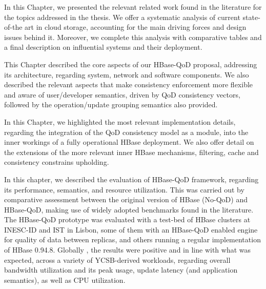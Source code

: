 
In this Chapter, we presented the relevant related work found in the literature for the topics addressed in the thesis. We offer a systematic analysis of current state-of-the art in cloud storage, accounting for the main driving forces and design issues behind it. Moreover, we complete this analysis with comparative tables and a final description on influential systems and their deployment. 


This Chapter described the core aspects of our HBase-QoD proposal, addressing its architecture, regarding system, network and software components. We also described the relevant aspects that make consistency enforcement more flexible and aware of user/developer semantics, driven by QoD consistency vectors, followed by the operation/update grouping semantics also provided.


In this Chapter, we highlighted the most relevant implementation details, regarding the integration of the QoD consistency model as a module, into the inner workings of a fully operational HBase deployment. We also offer detail on the extensions of the more relevant inner HBase mechanisms, filtering, cache and consistency constrains upholding.
 


In this chapter, we described the evaluation of HBase-QoD framework, regarding its performance, semantics, and resource utilization. This was carried out by comparative assessment between the original version of HBase (No-QoD) and HBase-QoD, making use of widely adopted benchmarks found in the literature.
The HBase-QoD prototype was evaluated with a test-bed of HBase clusters at INESC-ID and IST in Lisbon, some of them with an HBase-QoD enabled engine for quality of data between replicas, and others running a regular implementation of HBase 0.94.8.
Globally , the results were positive and in line with what was expected, across a variety of YCSB-derived workloads, regarding overall bandwidth utilization  and its peak usage, update latency (and application semantics), as well as CPU utilization.
